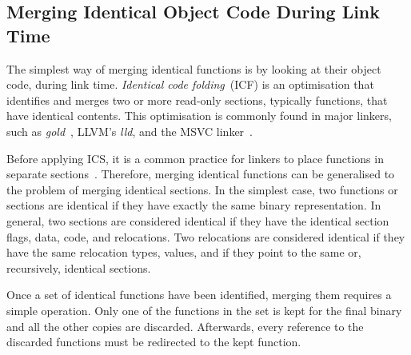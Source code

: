 
\subsection{Merging Identical Object Code During Link Time}

The simplest way of merging identical functions is by looking at their object code, during link time.
\textit{Identical code folding}~(ICF) is an optimisation that identifies and merges two or more read-only sections, typically functions, that have identical contents.
This optimisation is commonly found in major linkers, such as \textit{gold}~\cite{tallam10,kwan12}, LLVM's \textit{lld}, and the MSVC linker~\cite{msvc-icf}.

Before applying ICS, it is a common practice for linkers to place functions in separate sections~\cite{tallam10,kwan12}.
Therefore, merging identical functions can be generalised to the problem of merging identical sections.
In the simplest case, two functions or sections are identical if they have exactly the same binary representation.
In general, two sections are considered identical if they have the identical section flags, data, code, and relocations.
Two relocations are considered identical if they have the same relocation types, values, and if they point to the same or, recursively, identical sections.


Once a set of identical functions have been identified, merging them requires a simple operation.
Only one of the functions in the set is kept for the final binary and all the other copies are discarded.
Afterwards, every reference to the discarded functions must be redirected to the kept function.


